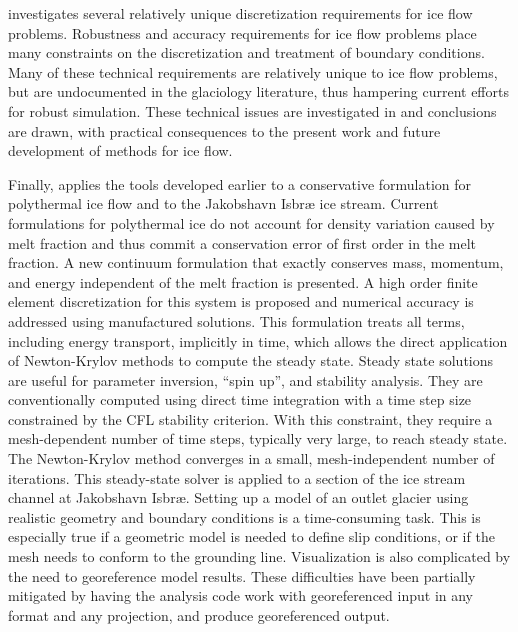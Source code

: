  investigates several relatively unique discretization requirements for ice flow problems.
Robustness and accuracy requirements for ice flow problems place many constraints on the discretization and treatment of boundary conditions.
Many of these technical requirements are relatively unique to ice flow problems, but are undocumented in the glaciology literature, thus hampering current efforts for robust simulation.
These technical issues are investigated in  and conclusions are drawn, with practical consequences to the present work and future development of methods for ice flow.

Finally,  applies the tools developed earlier to a conservative formulation for polythermal ice flow and to the Jakobshavn Isbr{\ae} ice stream.
Current formulations for polythermal ice do not account for density variation caused by melt fraction and thus commit a conservation error of first order in the melt fraction.
A new continuum formulation that exactly conserves mass, momentum, and energy independent of the melt fraction is presented.
A high order finite element discretization for this system is proposed and numerical accuracy is addressed using manufactured solutions.
This formulation treats all terms, including energy transport, implicitly in time, which allows the direct application of Newton-Krylov methods to compute the steady state.
Steady state solutions are useful for parameter inversion, ``spin up'', and stability analysis.
They are conventionally computed using direct time integration with a time step size constrained by the CFL stability criterion.
With this constraint, they require a mesh-dependent number of time steps, typically very large, to reach steady state.
The Newton-Krylov method converges in a small, mesh-independent number of iterations.
This steady-state solver is applied to a section of the ice stream channel at Jakobshavn Isbr{\ae}.
Setting up a model of an outlet glacier using realistic geometry and boundary conditions is a time-consuming task.
This is especially true if a geometric model is needed to define slip conditions, or if the mesh needs to conform to the grounding line.
Visualization is also complicated by the need to georeference model results.
These difficulties have been partially mitigated by having the analysis code work with georeferenced input in any format and any projection, and produce georeferenced output.
